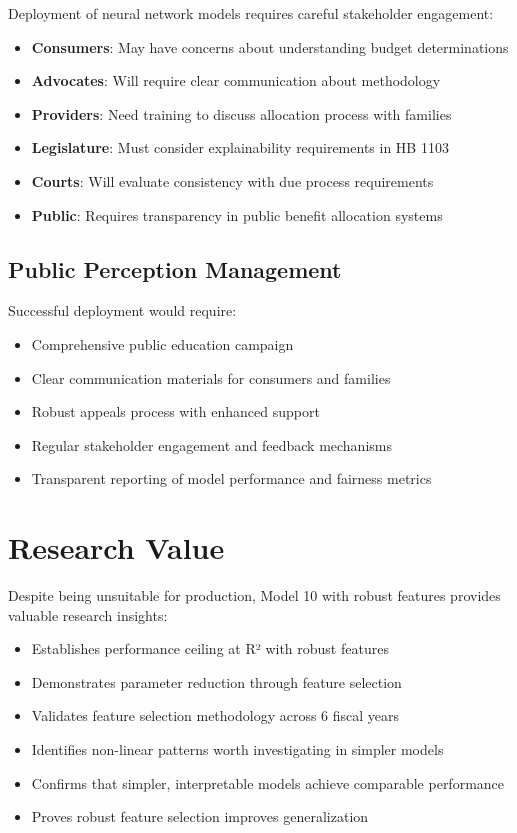Deployment of neural network models requires careful stakeholder engagement:

\begin{itemize}
    \item \textbf{Consumers}: May have concerns about understanding budget determinations
    \item \textbf{Advocates}: Will require clear communication about methodology
    \item \textbf{Providers}: Need training to discuss allocation process with families
    \item \textbf{Legislature}: Must consider explainability requirements in HB 1103
    \item \textbf{Courts}: Will evaluate consistency with due process requirements
    \item \textbf{Public}: Requires transparency in public benefit allocation systems
\end{itemize}

\subsection{Public Perception Management}

Successful deployment would require:
\begin{itemize}
    \item Comprehensive public education campaign
    \item Clear communication materials for consumers and families
    \item Robust appeals process with enhanced support
    \item Regular stakeholder engagement and feedback mechanisms
    \item Transparent reporting of model performance and fairness metrics
\end{itemize}

\section{Research Value}

Despite being unsuitable for production, Model 10 with robust features provides valuable research insights:

\begin{itemize}
    \item Establishes performance ceiling at \ModelTenRSquaredTest{} R² with \ModelTenRobustFeatures{} robust features
    \item Demonstrates \ModelTenParameterReduction{} parameter reduction through feature selection
    \item Validates feature selection methodology across 6 fiscal years
    \item Identifies non-linear patterns worth investigating in simpler models
    \item Confirms that simpler, interpretable models achieve comparable performance
    \item Proves robust feature selection improves generalization
\end{itemize}

